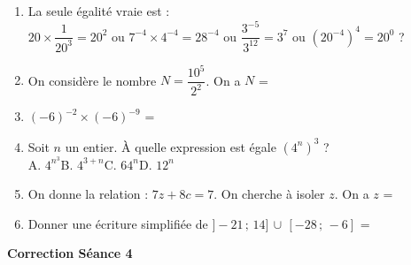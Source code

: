 \documentclass[a4paper,11pt]{article}
\begin{document}
\vspace*{2cm}
\begin{seanceD}{} %

\begin{enumerate}
\item La seule égalité vraie est : \\
$20\times \dfrac{1}{20^{3}}=20^{2}$ ou $7^{-4}\times 4^{-4}=28^{-4}$ ou $\dfrac{3^{-5}}{3^{12}}=3^{7}$ ou $\left(20^{-4}\right)^4=20^{0}$ ?



\item On considère le nombre $N=\dfrac{10^5}{2^2}$. On a $N$ = \dotfill

\item $(-6)^{-2}\times (-6)^{-9}$ = \dotfill

\item  Soit $n$ un entier.  À quelle expression est égale $\left(4^{n}\right)^{3}$ ?\\ 
    
    	A. $4^{n^{3}}$\qquad B. $4^{3+n}$\qquad C. $64^{n}$\qquad D. $12^{n}$\qquad 

\dotfill

\item On donne la relation : $7z+8c=7$. On cherche à isoler $z$. On a $z$ = \dotfill

\item Donner une écriture simplifiée de $]-21\,;\,14]\,\cup \,[ -28\,;\,-6]$ = \dotfill


\end{enumerate}

\end{seanceD} %
\vspace{0.5cm}
\begin{center}

\textbf{\textcolor{Couleur8}{Correction Séance 4}}\\
\vspace{2mm}

\end{center}

\newpage

\end{document}
